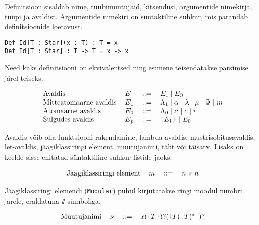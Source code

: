 \documentclass[12pt]{article}
\begin{document}
      Definitsioon sisaldab nime, tüübimuutujaid, kitsendusi, argumentide nimekirja, tüüpi ja avaldist. Argumentide nimekiri on süntaktiline suhkur, mis parandab definitsioonide loetavust.

      \begin{verbatim}Def Id[T : Star](x : T) : T = x
Def Id[T : Star] : T -> T = x -> x\end{verbatim}

      Need kaks definitsiooni on ekvivalentsed ning esimene teisendatakse parsimise järel teiseks.

      \begin{equation*}
        \begin{tabular}{llll}
          Avaldis                & $E$   & $::=$ & $E_1\mid E_0$                                                           \\
          Mitteatomaarne avaldis & $E_1$ & $::=$ & $\Lambda_1\mid\alpha\mid\lambda\mid\mu\mid\Psi\mid m$                   \\
          Atomaarne avaldis      & $E_0$ & $::=$ & $\Lambda_0\mid\nu\mid c\mid i$                                         \\
          Sulgudes avaldis       & $E_p$ & $::=$ & {\color{helehall}\verb!(!}$E_1${\color{helehall}\verb!)!} $\mid E_0$
        \end{tabular}
      \end{equation*}

      Avaldis võib olla funktsiooni rakendamine, lambda-avaldis, mustrisobitusavaldis, let-avaldis, jäägiklassiringi element, muutujanimi, täht või täisarv. Lisaks on keelde sisse ehitatud süntaktiline suhkur listide jaoks.

      \begin{equation*}
        \begin{tabular}{llll}
          Jäägiklassiringi element & $m$ & $::=$ & $n$ {\color{helehall}\verb!#!} $n$
        \end{tabular}
      \end{equation*}

      Jäägiklassiringi elemendi (\verb!Modular!) puhul kirjutatakse ringi moodul numbri järele, eraldatuna \verb!#! sümboliga.

      \begin{equation*}
        \begin{tabular}{llll}
          Muutujanimi & $\nu$ & $::=$ & $x(${\color{helehall}\verb!{!}$T${\color{helehall}\verb!}!}$)?(${\color{helehall}\verb![!}$T(${\color{helehall}\verb!,!}$T)^*${\color{helehall}\verb!]!}$)?$
        \end{tabular}
      \end{equation*}
\end{document}

